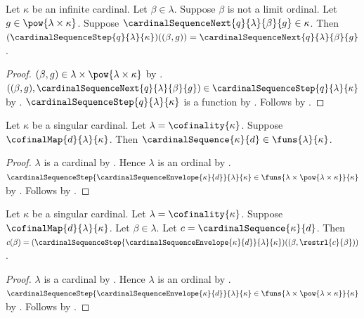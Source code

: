 \begin{proposition}\label{cardinal_sequence_step_next}
    Let $\kappa$ be an infinite cardinal.
    Let $\beta\in\lambda$.
    Suppose $\beta$ is not a limit ordinal.
    Let $g\in\pow{\lambda\times\kappa}$.
    Suppose $\cardinalSequenceNext{q}{\lambda}{\beta}{g}\in\kappa$.
    Then $(\cardinalSequenceStep{q}{\lambda}{\kappa})((\beta,g))
        =\cardinalSequenceNext{q}{\lambda}{\beta}{g}$.
\end{proposition}
\begin{proof}
    $(\beta,g)\in\lambda\times\pow{\lambda\times\kappa}$
        by .
    $((\beta,g),\cardinalSequenceNext{q}{\lambda}{\beta}{g})
        \in\cardinalSequenceStep{q}{\lambda}{\kappa}$
        by .
    $\cardinalSequenceStep{q}{\lambda}{\kappa}$ is a function
        by .
    Follows by .
\end{proof}

\begin{proposition}\label{cardinal_sequence_type}
    Let $\kappa$ be a singular cardinal.
    Let $\lambda=\cofinality{\kappa}$.
    Suppose $\cofinalMap{d}{\lambda}{\kappa}$.
    Then $\cardinalSequence{\kappa}{d}\in\funs{\lambda}{\kappa}$.
\end{proposition}
\begin{proof}
    $\lambda$ is a cardinal by .
    Hence $\lambda$ is an ordinal by .
    $\cardinalSequenceStep{\cardinalSequenceEnvelope{\kappa}{d}}
        {\lambda}{\kappa}
        \in\funs{\lambda\times\pow{\lambda\times\kappa}}{\kappa}$
        by .
    Follows by
        .
\end{proof}

\begin{proposition}\label{cardinal_sequence_equation}
    Let $\kappa$ be a singular cardinal.
    Let $\lambda=\cofinality{\kappa}$.
    Suppose $\cofinalMap{d}{\lambda}{\kappa}$.
    Let $\beta\in\lambda$.
    Let $c=\cardinalSequence{\kappa}{d}$.
    Then $c(\beta)=
        (\cardinalSequenceStep{\cardinalSequenceEnvelope{\kappa}{d}}
            {\lambda}{\kappa})((\beta,\restrl{c}{\beta}))$.
\end{proposition}
\begin{proof}
    $\lambda$ is a cardinal by .
    Hence $\lambda$ is an ordinal by .
    $\cardinalSequenceStep{\cardinalSequenceEnvelope{\kappa}{d}}
        {\lambda}{\kappa}
        \in\funs{\lambda\times\pow{\lambda\times\kappa}}{\kappa}$
        by .
    Follows by
        .
\end{proof}

